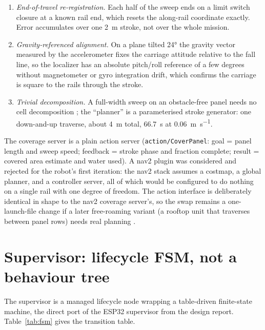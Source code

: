 \documentclass[11pt,a4paper]{article}
\begin{document}
\begin{enumerate}[nosep]
\item \emph{End-of-travel re-registration.} Each half of the sweep ends on a limit
  switch closure at a known rail end, which resets the along-rail coordinate exactly.
  Error accumulates over one \SI{2}{\metre} stroke, not over the whole mission.
\item \emph{Gravity-referenced alignment.} On a plane tilted \ang{24} the gravity
  vector measured by the accelerometer fixes the carriage attitude relative to the
  fall line, so the localizer has an absolute pitch/roll reference of a few degrees
  without magnetometer or gyro integration drift, which confirms the carriage is
  square to the rails through the stroke.
\item \emph{Trivial decomposition.} A full-width sweep on an obstacle-free panel
  needs no cell decomposition \cite{choset2000coverage}; the ``planner'' is a
  parameterised stroke generator: one down-and-up traverse, about \SI{4}{\metre}
  total, \SI{66.7}{\second} at \SI{0.06}{\metre\per\second}.
\end{enumerate}

The coverage server is a plain action server (\texttt{action/CoverPanel}: goal =
panel length and sweep speed; feedback = stroke phase and fraction complete;
result = covered area estimate and water used). A nav2 plugin was considered and
rejected for the robot's first iteration: the nav2 stack assumes a costmap, a
global planner, and a controller server, all of which would be configured to do
nothing on a single rail with one degree of freedom. The action interface is
deliberately identical in shape to the nav2 coverage server's, so the swap remains
a one-launch-file change if a later free-roaming variant (a rooftop unit that
traverses between panel rows) needs real planning \cite{macenski2020marathon}.

\section{Supervisor: lifecycle FSM, not a behaviour tree}
\label{sec:supervisor}
The supervisor is a managed lifecycle node wrapping a table-driven finite-state
machine, the direct port of the ESP32 supervisor from the design report.
Table~\ref{tab:fsm} gives the transition table.
\end{document}
